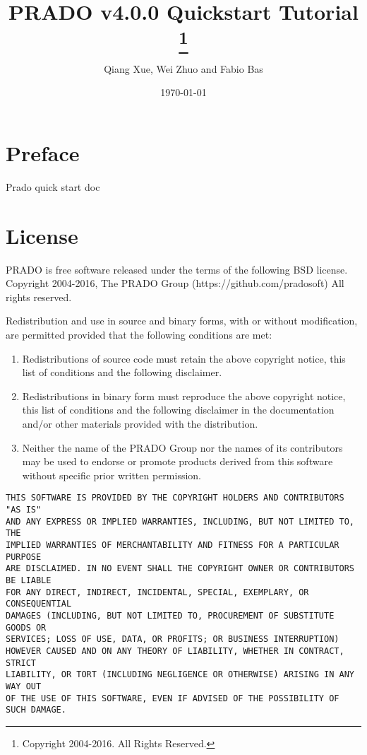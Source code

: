 \documentclass{book}
\title{\Huge \bfseries PRADO v4.0.0 Quickstart Tutorial
    \thanks{Copyright 2004-2016. All Rights Reserved.}
}
\author{Qiang Xue, Wei Zhuo and Fabio Bas}
\date{\today}
\begin{document}
\maketitle

\pagestyle{plain}
\tableofcontents

\chapter*{Preface}
Prado quick start doc

\chapter*{License}
PRADO is free software released under the terms of the following BSD license.\\
Copyright 2004-2016, The PRADO Group (https://github.com/pradosoft)
All rights reserved.

Redistribution and use in source and binary forms, with or without
modification, are permitted provided that the following conditions are met:
\begin{enumerate}
	\item Redistributions of source code must retain the above copyright notice,
this list of conditions and the following disclaimer.

 \item Redistributions in binary form must reproduce the above copyright notice,
this list of conditions and the following disclaimer in the documentation
and/or other materials provided with the distribution.

\item Neither the name of the PRADO Group nor the names of its contributors may
be used to endorse or promote products derived from this software without
specific prior written permission.
\end{enumerate}

\begin{verbatim}
THIS SOFTWARE IS PROVIDED BY THE COPYRIGHT HOLDERS AND CONTRIBUTORS "AS IS"
AND ANY EXPRESS OR IMPLIED WARRANTIES, INCLUDING, BUT NOT LIMITED TO, THE
IMPLIED WARRANTIES OF MERCHANTABILITY AND FITNESS FOR A PARTICULAR PURPOSE
ARE DISCLAIMED. IN NO EVENT SHALL THE COPYRIGHT OWNER OR CONTRIBUTORS BE LIABLE
FOR ANY DIRECT, INDIRECT, INCIDENTAL, SPECIAL, EXEMPLARY, OR CONSEQUENTIAL
DAMAGES (INCLUDING, BUT NOT LIMITED TO, PROCUREMENT OF SUBSTITUTE GOODS OR
SERVICES; LOSS OF USE, DATA, OR PROFITS; OR BUSINESS INTERRUPTION)
HOWEVER CAUSED AND ON ANY THEORY OF LIABILITY, WHETHER IN CONTRACT, STRICT
LIABILITY, OR TORT (INCLUDING NEGLIGENCE OR OTHERWISE) ARISING IN ANY WAY OUT
OF THE USE OF THIS SOFTWARE, EVEN IF ADVISED OF THE POSSIBILITY OF SUCH DAMAGE.
\end{verbatim}
\end{document}
